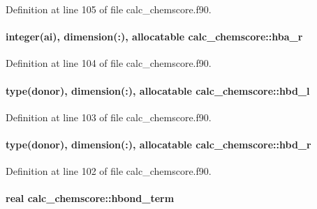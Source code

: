 Definition at line 105 of file calc\-\_\-chemscore.\-f90.

\hypertarget{classcalc__chemscore_a2d5806a7dbd81e921bd36250e2c5e625}{
\paragraph[{hba\-\_\-r}]{\setlength{\rightskip}{0pt plus 5cm}integer(ai), dimension(\-:), allocatable calc\-\_\-chemscore\-::hba\-\_\-r}}\label{classcalc__chemscore_a2d5806a7dbd81e921bd36250e2c5e625}


Definition at line 104 of file calc\-\_\-chemscore.\-f90.

\hypertarget{classcalc__chemscore_a38023298e024f0fc25e3f31f390cffb8}{
\paragraph[{hbd\-\_\-l}]{\setlength{\rightskip}{0pt plus 5cm}type({\bf donor}), dimension(\-:), allocatable calc\-\_\-chemscore\-::hbd\-\_\-l}}\label{classcalc__chemscore_a38023298e024f0fc25e3f31f390cffb8}


Definition at line 103 of file calc\-\_\-chemscore.\-f90.

\hypertarget{classcalc__chemscore_aa414095b9d9b645a440912b5a2022214}{
\paragraph[{hbd\-\_\-r}]{\setlength{\rightskip}{0pt plus 5cm}type({\bf donor}), dimension(\-:), allocatable calc\-\_\-chemscore\-::hbd\-\_\-r}}\label{classcalc__chemscore_aa414095b9d9b645a440912b5a2022214}


Definition at line 102 of file calc\-\_\-chemscore.\-f90.

\hypertarget{classcalc__chemscore_a31441c347099258d0b25055878078c9f}{
\paragraph[{hbond\-\_\-term}]{\setlength{\rightskip}{0pt plus 5cm}real calc\-\_\-chemscore\-::hbond\-\_\-term}}\label{classcalc__chemscore_a31441c347099258d0b25055878078c9f}



